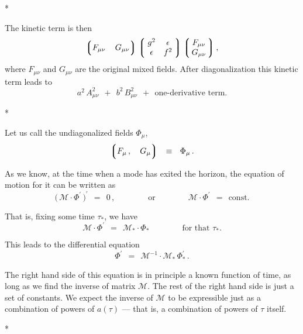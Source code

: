 \documentclass[12pt]{article}
\def\beq{\begin{equation}}
\def\eeq{\end{equation}}
\newcommand{\mc}[1]{\mathcal{#1}}
\newcommand{\lgr}{\left\lgroup}
\newcommand{\rgr}{\right\rgroup}
\begin{document}
\vspace{1.0cm}
\centerline{*\qquad\qquad\qquad*\qquad\qquad\qquad*}
\vspace{1.0cm}

	
	The kinetic term is then
\beq
	\lgr F_{\mu\nu}\, \quad G_{\mu\nu} \rgr 
	\lgr\; \begin{matrix}
				g^2        &    \epsilon  \\
				\epsilon   &    f^2
	\end{matrix} \;\rgr
	\lgr\, \begin{matrix}
		F_{\mu\nu}  \\
		G_{\mu\nu}
	     \end{matrix} \,\rgr,
\eeq
	where $ F_{\mu\nu} $ and $ G_{\mu\nu} $ are the original mixed fields.
	After diagonalization this kinetic term leads to
\beq
	a^2\, A_{\mu\nu}^2  ~~+~~  b^2\, B_{\mu\nu}^2  ~~+~~  \text{one-derivative term.}
\eeq


\vspace{1.0cm}
\centerline{*\qquad\qquad\qquad*\qquad\qquad\qquad*}
\vspace{1.0cm}

	
	Let us call the undiagonalized fields $ \Phi_\mu $,
\beq
	\lgr  F_\mu\,, \quad G_\mu  \rgr    ~~\equiv~~    \Phi_\mu\,.
\eeq


	As we know, at the time when a mode has exited the horizon, the equation of motion for
	it can be written as
\beq
	\big(\, \mc{M} \cdot \Phi^\prime \,\big)^\prime    ~~=~~    0\,,
	\qquad\qquad
	\text{or}
	\qquad\qquad
	\mc{M} \cdot \Phi^\prime    ~~=~~    \text{const}.
\eeq

	That is, fixing some time $ \tau_* $, we have
\beq
	\mc{M} \cdot \Phi^\prime    ~~=~~    \mc{M}_* \cdot \Phi_*
	\qquad\qquad
	\text{for that $\tau_*$}.
\eeq

	This leads to the differential equation
\beq
	\Phi^\prime  ~~=~~ \mc{M}^{-1} \cdot \mc{M}_*\, \Phi_*^\prime\,.
\eeq

	The right hand side of this equation is in principle a known function of time, as long as
	we find the inverse of matrix $ \mc{M} $.
	The rest of the right hand side is just a set of constants.
	We expect the inverse of $ \mc{M} $ to be expressible just as a combination of powers
	of $ a(\tau) $ --- that is, a combination of powers of $ \tau $ itself.


\vspace{1.0cm}
\centerline{*\qquad\qquad\qquad*\qquad\qquad\qquad*}
\vspace{1.0cm}
\end{document}
